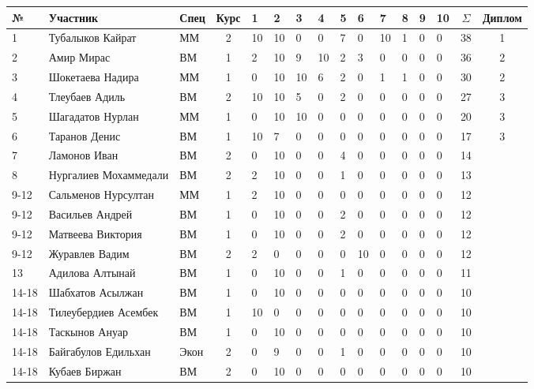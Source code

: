 \begin{center}
\begin{tabular}{|l|l|l|c|*{10}{p{0.3cm}|}c|c|}
\hline
№ & Участник & Спец & Курс & 1 & 2 & 3 & 4 & 5 & 6 & 7 & 8 & 9 & 10 & $\Sigma$ & Диплом\\
\hline
1 & Тубалыков Кайрат &  ММ & 2 & 10 & 10 & 0 & 0 & 7 & 0 & 10 & 1 & 0 & 0 & 38 & 1\\
\hline
2 & Амир Мирас &  ВМ & 1 & 2 & 10 & 9 & 10 & 2 & 3 & 0 & 0 & 0 & 0 & 36 & 2\\
\hline
3 & Шокетаева Надира &  ММ & 1 & 0 & 10 & 10 & 6 & 2 & 0 & 1 & 1 & 0 & 0 & 30 & 2\\
\hline
4 & Тлеубаев Адиль &  ВМ & 2 & 10 & 10 & 5 & 0 & 2 & 0 & 0 & 0 & 0 & 0 & 27 & 3\\
\hline
5 & Шагадатов Нурлан &  ММ & 1 & 0 & 10 & 10 & 0 & 0 & 0 & 0 & 0 & 0 & 0 & 20 & 3\\
\hline
6 & Таранов Денис &  ВМ & 1 & 10 & 7 & 0 & 0 & 0 & 0 & 0 & 0 & 0 & 0 & 17 & 3\\
\hline
7 & Ламонов Иван &  ВМ & 2 & 0 & 10 & 0 & 0 & 4 & 0 & 0 & 0 & 0 & 0 & 14 & \\
\hline
8 & Нургалиев Мохаммедали &  ВМ & 2 & 2 & 10 & 0 & 0 & 1 & 0 & 0 & 0 & 0 & 0 & 13 & \\
\hline
9-12 & Сальменов Нурсултан &  ММ & 1 & 2 & 10 & 0 & 0 & 0 & 0 & 0 & 0 & 0 & 0 & 12 & \\
\hline
9-12 & Васильев Андрей &  ВМ & 1 & 0 & 10 & 0 & 0 & 2 & 0 & 0 & 0 & 0 & 0 & 12 & \\
\hline
9-12 & Матвеева Виктория &  ВМ & 1 & 0 & 10 & 0 & 0 & 2 & 0 & 0 & 0 & 0 & 0 & 12 & \\
\hline
9-12 & Журавлев Вадим &  ВМ & 2 & 2 & 0 & 0 & 0 & 0 & 10 & 0 & 0 & 0 & 0 & 12 & \\
\hline
13 & Адилова Алтынай &  ВМ & 1 & 0 & 10 & 0 & 0 & 1 & 0 & 0 & 0 & 0 & 0 & 11 & \\
\hline
14-18 & Шабхатов Асылжан &  ВМ & 1 & 0 & 10 & 0 & 0 & 0 & 0 & 0 & 0 & 0 & 0 & 10 & \\
\hline
14-18 & Тилеубердиев Асембек &  ВМ & 1 & 10 & 0 & 0 & 0 & 0 & 0 & 0 & 0 & 0 & 0 & 10 & \\
\hline
14-18 & Таскынов Ануар &  ВМ & 1 & 0 & 10 & 0 & 0 & 0 & 0 & 0 & 0 & 0 & 0 & 10 & \\
\hline
14-18 & Байгабулов Едильхан &  Экон & 2 & 0 & 9 & 0 & 0 & 1 & 0 & 0 & 0 & 0 & 0 & 10 & \\
\hline
14-18 & Кубаев Биржан &  ВМ & 2 & 0 & 10 & 0 & 0 & 0 & 0 & 0 & 0 & 0 & 0 & 10 & \\

\end{tabular}
\end{center}
